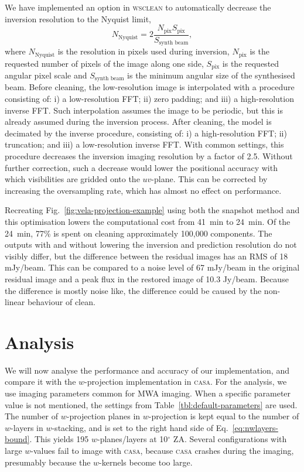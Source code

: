 \documentclass[useAMS,usenatbib]{mn2e}
\newcommand{\degree}{\ensuremath{^{\circ}}\xspace}
\begin{document}
We have implemented an option in \textsc{wsclean} to automatically decrease the inversion resolution to the Nyquist limit,
\begin{equation}\label{eq:nyquist-resolution}
 N_\textrm{Nyquist} = 2 \frac{N_\textrm{pix} S_\textrm{pix}}{S_\textrm{synth beam}},
\end{equation}
where $N_\textrm{Nyquist}$ is the resolution in pixels used during inversion, $N_\textrm{pix}$ is the requested number of pixels of the image along one side, $S_\textrm{pix}$ is the requested angular pixel scale and $S_\textrm{synth beam}$ is the minimum angular size of the synthesised beam. Before cleaning, the low-resolution image is interpolated with a procedure consisting of: i) a low-resolution FFT; ii) zero padding; and iii) a high-resolution inverse FFT. Such interpolation assumes the image to be periodic, but this is already assumed during the inversion process. After cleaning, the model is decimated by the inverse procedure, consisting of: i) a high-resolution FFT; ii) truncation; and iii) a low-resolution inverse FFT. With common settings, this procedure decreases the inversion imaging resolution by a factor of 2.5. Without further correction, such a decrease would lower the positional accuracy with which visibilities are gridded onto the $uv$-plane. This can be corrected by increasing the oversampling rate, which has almost no effect on performance.

Recreating Fig.~\ref{fig:vela-projection-example} using both the snapshot method and this optimisation lowers the computational cost from 41~min to 24~min. Of the 24~min, 77\% is spent on cleaning approximately 100,000 components. The outputs with and without lowering the inversion and prediction resolution do not visibly differ, but the difference between the residual images has an RMS of 18 mJy/beam. This can be compared to a noise level of 67 mJy/beam in the original residual image and a peak flux in the restored image of 10.3 Jy/beam. Because the difference is mostly noise like, the difference could be caused by the non-linear behaviour of clean.

\section{Analysis} \label{sec:analysis}
We will now analyse the performance and accuracy of our implementation, and compare it with the $w$-projection implementation in \textsc{casa}. For the analysis, we use imaging parameters common for MWA imaging. When a specific parameter value is not mentioned, the settings from Table~\ref{tbl:default-parameters} are used. The number of $w$-projection planes in $w$-projection is kept equal to the number of $w$-layers in $w$-stacking, and is set to the right hand side of Eq.~\eqref{eq:nwlayers-bound}. This yields 195 $w$-planes/layers at 10\degree ZA. Several configurations with large $w$-values fail to image with \textsc{casa}, because \textsc{casa} crashes during the imaging, presumably because the $w$-kernels become too large.
\end{document}
